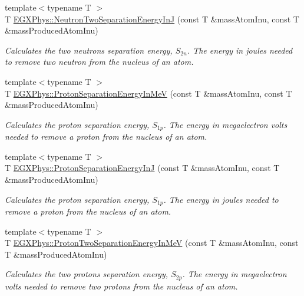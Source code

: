 \begin{DoxyCompactItemize}
{\footnotesize template$<$typename T $>$ }\\T \hyperlink{group___e_g_x_phys-_nuclear_separation_energy_ga293ac9428420a0adf4235048dbe529b4}{E\+G\+X\+Phys\+::\+Neutron\+Two\+Separation\+Energy\+InJ} (const T \&mass\+Atom\+Inu, const T \&mass\+Produced\+Atom\+Inu)
\begin{DoxyCompactList}\small\item\em Calculates the two neutrons separation energy, $S_{2n}$. The energy in joules needed to remove two neutron from the nucleus of an atom. \end{DoxyCompactList}\item 
{\footnotesize template$<$typename T $>$ }\\T \hyperlink{group___e_g_x_phys-_nuclear_separation_energy_ga6a619ded55c47ed22ea2d8a85202ebeb}{E\+G\+X\+Phys\+::\+Proton\+Separation\+Energy\+In\+MeV} (const T \&mass\+Atom\+Inu, const T \&mass\+Produced\+Atom\+Inu)
\begin{DoxyCompactList}\small\item\em Calculates the proton separation energy, $S_{1p}$. The energy in megaelectron volts needed to remove a proton from the nucleus of an atom. \end{DoxyCompactList}\item 
{\footnotesize template$<$typename T $>$ }\\T \hyperlink{group___e_g_x_phys-_nuclear_separation_energy_ga4274d8f5a3860169fd81970707eb582a}{E\+G\+X\+Phys\+::\+Proton\+Separation\+Energy\+InJ} (const T \&mass\+Atom\+Inu, const T \&mass\+Produced\+Atom\+Inu)
\begin{DoxyCompactList}\small\item\em Calculates the proton separation energy, $S_{1p}$. The energy in joules needed to remove a proton from the nucleus of an atom. \end{DoxyCompactList}\item 
{\footnotesize template$<$typename T $>$ }\\T \hyperlink{group___e_g_x_phys-_nuclear_separation_energy_ga0de42783a7c650eb32f85dc2d40d84d7}{E\+G\+X\+Phys\+::\+Proton\+Two\+Separation\+Energy\+In\+MeV} (const T \&mass\+Atom\+Inu, const T \&mass\+Produced\+Atom\+Inu)
\begin{DoxyCompactList}\small\item\em Calculates the two protons separation energy, $S_{2p}$. The energy in megaelectron volts needed to remove two protons from the nucleus of an atom. \end{DoxyCompactList}\item 

\end{DoxyCompactItemize}
